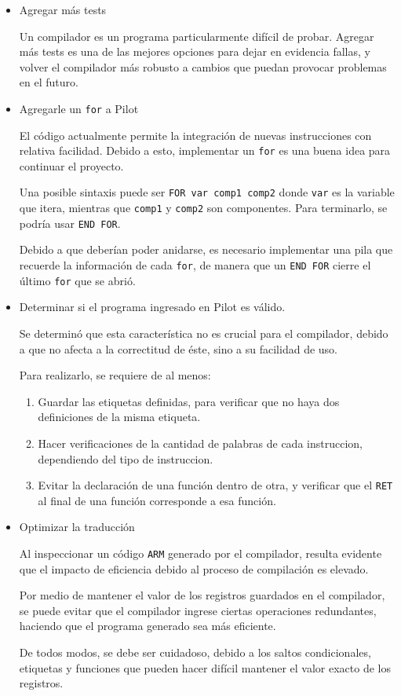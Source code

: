 \documentclass[12pt,spanish]{article}
\begin{document}
\begin{itemize}
\item{Agregar más tests}

Un compilador es un programa particularmente difícil de probar. Agregar más tests es una de las mejores opciones para dejar en evidencia fallas, y volver el compilador más robusto a cambios que puedan provocar problemas en el futuro.

\item{Agregarle un \texttt{for} a Pilot}

El código actualmente permite la integración de nuevas instrucciones con relativa facilidad. Debido a esto, implementar un \texttt{for} es una buena idea para continuar el proyecto. 

Una posible sintaxis puede ser \texttt{FOR var comp1 comp2} donde \texttt{var} es la variable que itera, mientras que \texttt{comp1} y \texttt{comp2} son componentes. Para terminarlo, se podría usar \texttt{END FOR}.

Debido a que deberían poder anidarse, es necesario implementar una pila que recuerde la información de cada \texttt{for}, de manera que un \texttt{END FOR} cierre el último \texttt{for} que se abrió.

\item{Determinar si el programa ingresado en Pilot es válido.}

Se determinó que esta característica no es crucial para el compilador, debido a que no afecta a la correctitud de éste, sino a su facilidad de uso.

Para realizarlo, se requiere de al menos:
\begin{enumerate}
\item{Guardar las etiquetas definidas, para verificar que no haya dos definiciones de la misma etiqueta.}
\item{Hacer verificaciones de la cantidad de palabras de cada instruccion, dependiendo del tipo de instruccion.}
\item{Evitar la declaración de una función dentro de otra, y verificar que el \texttt{RET} al final de una función corresponde a esa función.}
\end{enumerate}

\item{Optimizar la traducción}

Al inspeccionar un código \texttt{ARM} generado por el compilador, resulta evidente que el impacto de eficiencia debido al proceso de compilación es elevado.

Por medio de mantener el valor de los registros guardados en el compilador, se puede evitar que el compilador ingrese ciertas operaciones redundantes, haciendo que el programa generado sea más eficiente.

De todos modos, se debe ser cuidadoso, debido a los saltos condicionales, etiquetas y funciones que pueden hacer difícil mantener el valor exacto de los registros.

\end{itemize}
\end{document}
